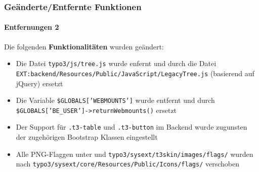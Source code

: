 \begin{frame}[fragile]
	\frametitle{Geänderte/Entfernte Funktionen}
	\framesubtitle{Entfernungen 2}

	\lstset{
		basicstyle=\tiny\ttfamily
	}

	Die folgenden \textbf{Funktionalitäten} wurden geändert:

	\begin{itemize}

		\item Die Datei \texttt{typo3/js/tree.js} wurde enfernt und durch die Datei \texttt{EXT:backend/Resources/Public/JavaScript/LegacyTree.js} (basierend auf jQuery) ersetzt

		\item Die Variable \texttt{\$GLOBALS['WEBMOUNTS']} wurde entfernt und durch \texttt{\$GLOBALS['BE\_USER']->returnWebmounts()} ersetzt

		\item Der Support für \texttt{.t3-table} und \texttt{.t3-button} im Backend wurde zugunsten der zugehörigen Bootstrap Klassen eingestellt

		\item Alle PNG-Flaggen unter  und \texttt{typo3/sysext/t3skin/images/flags/} wurden nach \texttt{typo3/sysext/core/Resources/Public/Icons/flags/} verschoben

	\end{itemize}

\end{frame}



